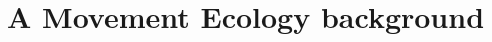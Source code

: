 \documentclass[a4paper,12pt]{article}
\begin{document}
\newpage


\section*{A Movement Ecology background}
%
\end{document}
